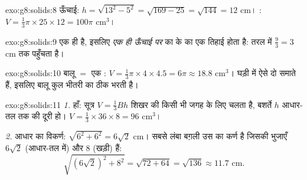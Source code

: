 \begin{solution}{exo:g8:solids:8}
ऊँचाई: $h = \sqrt{13^2 - 5^2} = \sqrt{169 - 25} = \sqrt{144} = 12$
cm। : $V = \frac13 \pi \times 25 \times 12 = 100\pi$ cm$^3$।
\end{solution}

\begin{solution}{exo:g8:solids:9}
 एक ही है, इसलिए \emph{एक ही ऊँचाई पर}  का   के
 का एक तिहाई होता है: तरल  में
$\frac{9}{3} = 3$ cm तक पहुँचता है।
\end{solution}

\begin{solution}{exo:g8:solids:10}
बालू $=$ एक : $V = \frac13 \pi \times 4 \times 4.5 = 6\pi
\approx 18.8$ cm$^3$। घड़ी में ऐसे दो  समाते हैं, इसलिए बालू कुल
भीतरी  का ठीक  भरती है।
\end{solution}

\begin{solution}{exo:g8:solids:11}
\emph{1.} हाँ: सूत्र $V = \frac13 Bh$ शिखर की किसी भी जगह के लिए
चलता है, बशर्ते $h$ आधार-तल तक की  दूरी हो।
$V = \frac13 \times 36 \times 8 = 96$ cm$^3$।

\emph{2.} आधार का विकर्ण: $\sqrt{6^2 + 6^2} = 6\sqrt2$ cm। सबसे लंबा
बग़ली  उस  का कर्ण है जिसकी  भुजाएँ
$6\sqrt2$ (आधार-तल में) और $8$ (खड़ी) हैं:
\[
\sqrt{(6\sqrt2)^2 + 8^2} = \sqrt{72 + 64} = \sqrt{136} \approx 11.7
\text{ cm}.
\]
\end{solution}

